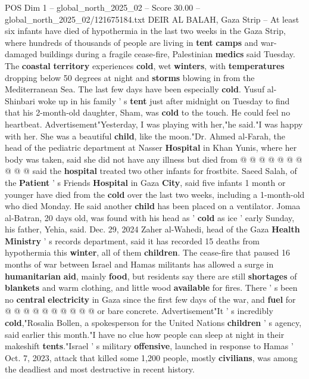 \begin{textsample}{POS Dim 1 – global\_north\_2025\_02 – Score 30.00 – global\_north\_2025\_02/121675184.txt}  \label{ex:f1_pos_433}
DEIR AL BALAH, Gaza Strip -- At least six infants have died of hypothermia in the last two weeks in the Gaza Strip, where hundreds of thousands of people are living in \textbf{tent} \textbf{camps} and war-damaged buildings during a fragile cease-fire, Palestinian \textbf{medics} said Tuesday.
The \textbf{coastal} \textbf{territory} experiences \textbf{cold}, wet \textbf{winters}, with \textbf{temperatures} dropping below 50 degrees at night and \textbf{storms} blowing in from the Mediterranean Sea.
The last few days have been especially \textbf{cold}.
Yusuf al-Shinbari woke up in his family ' s \textbf{tent} just after midnight on Tuesday to find that his 2-month-old daughter, Sham, was \textbf{cold} to the touch.
He could feel no heartbeat.
Advertisement"Yesterday, I was playing with her,"he said."I was happy with her.
She was a beautiful \textbf{child}, like the moon."Dr.
Ahmed al-Farah, the head of the pediatric department at Nasser \textbf{Hospital} in Khan Yunis, where her body was taken, said she did not have any illness but died from @ @ @ @ @ @ @ @ @ @ said the \textbf{hospital} treated two other infants for frostbite.
Saeed Salah, of the \textbf{Patient} ' s Friends \textbf{Hospital} in Gaza \textbf{City}, said five infants 1 month or younger have died from the \textbf{cold} over the last two weeks, including a 1-month-old who died Monday.
He said another \textbf{child} has been placed on a ventilator.
Jomaa al-Batran, 20 days old, was found with his head as ' \textbf{cold} as ice ' early Sunday, his father, Yehia, said.
Dec. 29, 2024 Zaher al-Wahedi, head of the Gaza \textbf{Health} \textbf{Ministry} ' s records department, said it has recorded 15 deaths from hypothermia this \textbf{winter}, all of them \textbf{children}.
The cease-fire that paused 16 months of war between Israel and Hamas militants has allowed a surge in \textbf{humanitarian} \textbf{aid}, mainly \textbf{food}, but residents say there are still \textbf{shortages} of \textbf{blankets} and warm clothing, and little wood \textbf{available} for fires.
There ' s been no \textbf{central} \textbf{electricity} in Gaza since the first few days of the war, and \textbf{fuel} for @ @ @ @ @ @ @ @ @ @ or bare concrete.
Advertisement"It ' s incredibly \textbf{cold},"Rosalia Bollen, a spokesperson for the United Nations \textbf{children} ' s agency, said earlier this month."I have no clue how people can sleep at night in their makeshift \textbf{tents}."Israel ' s military \textbf{offensive}, launched in response to Hamas ' Oct. 7, 2023, attack that killed some 1,200 people, mostly \textbf{civilians}, was among the deadliest and most destructive in recent history.

\end{textsample}
